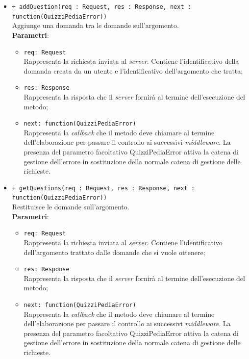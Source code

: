 \begin{itemize}
\begin{itemize}
\begin{itemize}
			\end{itemize}
			\item \texttt{+ addQuestion(req : Request, res : Response, next : function(QuizziPediaError))} \\
			Aggiunge una domanda tra le domande sull'argomento.  \\
			\textbf{Parametri}:
			\begin{itemize}
			\item \texttt{req: Request} \\
			Rappresenta la richiesta inviata al \textit{server}. Contiene l'identificativo della domanda creata da un utente e l'identificativo dell'argomento che tratta;
			\item \texttt{res: Response} \\
			Rappresenta la risposta che il \textit{server} fornirà al termine dell'esecuzione del metodo;
			\item \texttt{next: function(QuizziPediaError)} \\
			Rappresenta la \textit{callback} che il metodo deve chiamare al termine dell'elaborazione per passare il controllo ai successivi \textit{middleware}. La presenza del parametro facoltativo QuizziPediaError attiva la catena di gestione dell'errore in sostituzione della normale catena di gestione delle richieste.
			\end{itemize}
			\item \texttt{+ getQuestions(req : Request, res : Response, next : function(QuizziPediaError))} \\
			Restituisce le domande sull'argomento.  \\
			\textbf{Parametri}:
			\begin{itemize}
			\item \texttt{req: Request} \\
			Rappresenta la richiesta inviata al \textit{server}. Contiene l'identificativo dell'argomento trattato dalle domande che si vuole ottenere;
			\item \texttt{res: Response} \\
			Rappresenta la risposta che il \textit{server} fornirà al termine dell'esecuzione del metodo;
			\item \texttt{next: function(QuizziPediaError)} \\
			Rappresenta la \textit{callback} che il metodo deve chiamare al termine dell'elaborazione per passare il controllo ai successivi \textit{middleware}. La presenza del parametro facoltativo QuizziPediaError attiva la catena di gestione dell'errore in sostituzione della normale catena di gestione delle richieste.

\end{itemize}
\end{itemize}
\end{itemize}
